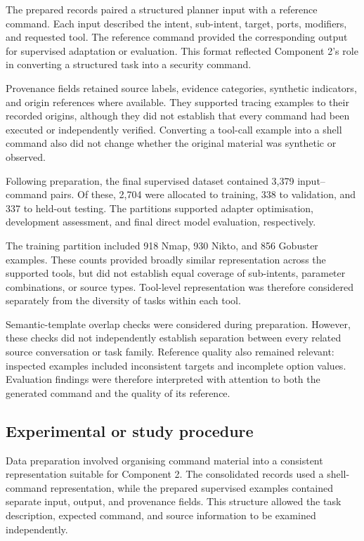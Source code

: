 \documentclass[
]{article}
\begin{document}
The prepared records paired a structured planner input with a reference
command. Each input described the intent, sub-intent, target, ports,
modifiers, and requested tool. The reference command provided the
corresponding output for supervised adaptation or evaluation. This
format reflected Component 2's role in converting a structured task into
a security command.

Provenance fields retained source labels, evidence categories, synthetic
indicators, and origin references where available. They supported
tracing examples to their recorded origins, although they did not
establish that every command had been executed or independently
verified. Converting a tool-call example into a shell command also did
not change whether the original material was synthetic or observed.

Following preparation, the final supervised dataset contained 3,379
input--command pairs. Of these, 2,704 were allocated to training, 338 to
validation, and 337 to held-out testing. The partitions supported
adapter optimisation, development assessment, and final direct model
evaluation, respectively.

The training partition included 918 Nmap, 930 Nikto, and 856 Gobuster
examples. These counts provided broadly similar representation across
the supported tools, but did not establish equal coverage of
sub-intents, parameter combinations, or source types. Tool-level
representation was therefore considered separately from the diversity of
tasks within each tool.

Semantic-template overlap checks were considered during preparation.
However, these checks did not independently establish separation between
every related source conversation or task family. Reference quality also
remained relevant: inspected examples included inconsistent targets and
incomplete option values. Evaluation findings were therefore interpreted
with attention to both the generated command and the quality of its
reference.

\hypertarget{experimental-or-study-procedure}{%
\subsection{Experimental or study
procedure}\label{experimental-or-study-procedure}}

Data preparation involved organising command material into a consistent
representation suitable for Component 2. The consolidated records used a
shell-command representation, while the prepared supervised examples
contained separate input, output, and provenance fields. This structure
allowed the task description, expected command, and source information
to be examined independently.
\end{document}
